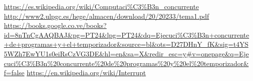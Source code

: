 \documentclass{article}
\begin{document}
\newpage
\begin{thebibliography}{4}
	\bibitem{} \url{https://es.wikipedia.org/wiki/Computaci\%C3\%B3n\_concurrente}
	\bibitem{} \url{http://www2.ulpgc.es/hege/almacen/download/20/20233/tema1.pdf}
	\bibitem{} \url{https://books.google.co.ve/books?id=8nTnCgAAQBAJ\&pg=PT24\&lpg=PT24\&dq=Ejecuci\%C3\%B3n+concurrente+de+programas+y+el+temporizador\&source=bl\&ots=D27DHnY\_fK\&sig=t4YS5WZh7EwYU1s0eiRsCzVG3DE\&hl=en\&sa=X\&redir\_esc=y\#v=onepage\&q=Ejecuci\%C3\%B3n\%20concurrente\%20de\%20programas\%20y\%20el\%20temporizador\&f=false}
	\bibitem{} \url{https://en.wikipedia.org/wiki/Interrupt}
\end{thebibliography}
	
\end{document}
